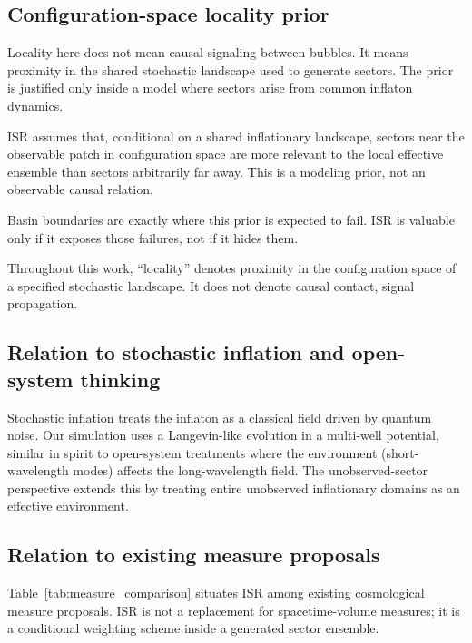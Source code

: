 \subsection{Configuration-space locality prior}\label{sec:locality_prior}

Locality here does not mean causal signaling between bubbles.
It means proximity in the shared stochastic landscape used to generate
sectors. The prior is justified only inside a model where sectors arise
from common inflaton dynamics.

ISR assumes that, conditional on a shared inflationary landscape, sectors
near the observable patch in configuration space are more relevant to the
local effective ensemble than sectors arbitrarily far away.
This is a modeling prior, not an observable causal relation.

Basin boundaries are exactly where this prior is expected to fail.
ISR is valuable only if it exposes those failures, not if it hides them.

Throughout this work, ``locality'' denotes proximity in the configuration space
of a specified stochastic landscape. It does not denote causal contact, signal
propagation.

\subsection{Relation to stochastic inflation and open-system thinking}

Stochastic inflation \cite{starobinsky_stochastic,burgess_stochastic} treats the inflaton as
a classical field driven by quantum noise.
Our simulation uses a Langevin-like evolution in a multi-well potential,
similar in spirit to open-system treatments where the environment
(short-wavelength modes) affects the long-wavelength field.
The unobserved-sector perspective extends this by treating entire unobserved
inflationary domains as an effective environment.

\subsection{Relation to existing measure proposals}

Table~\ref{tab:measure_comparison} situates ISR among existing cosmological
measure proposals. ISR is not a replacement for spacetime-volume measures;
it is a conditional weighting scheme inside a generated sector ensemble.



